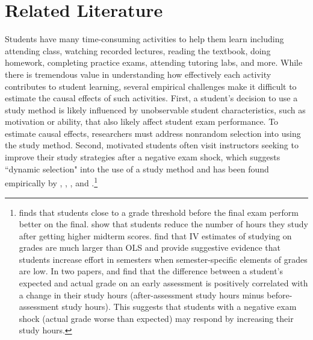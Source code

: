 \documentclass[12pt]{article}
\begin{document}

\section{Related Literature} \label{background}

Students have many time-consuming activities to help them learn including attending class, watching recorded lectures, reading the textbook, doing homework, completing practice exams, attending tutoring labs, and more. While there is tremendous value in understanding how effectively each activity contributes to student learning, several empirical challenges make it difficult to estimate the causal effects of such activities. First, a student's decision to use a study method is likely influenced by unobservable student characteristics, such as motivation or ability, that also likely affect student exam performance. To estimate causal effects, researchers must address nonrandom selection into using the study method. Second, motivated students often visit instructors seeking to improve their study strategies after a negative exam shock, which suggests ``dynamic selection" into the use of a study method and has been found empirically by \textcite{oettinger2002}, \textcite{ko2005}, \textcite{ss2008}, \textcite{bo2012} and \textcite{bo2015}.\footnote{\textcite{oettinger2002} finds that students close to a grade threshold before the final exam perform better on the final. \textcite{ko2005} show that students reduce the number of hours they study after getting higher midterm scores. \textcite{ss2008} find that IV estimates of studying on grades are much larger than OLS and provide suggestive evidence that students increase effort in semesters when semester-specific elements of grades are low. In two papers, \textcite{bo2012} and \textcite{bo2015} find that the difference between a student's expected and actual grade on an early assessment is positively correlated with a change in their study hours (after-assessment study hours minus before-assessment study hours). This suggests that students with a negative exam shock (actual grade worse than expected) may respond by increasing their study hours.}
\end{document}
